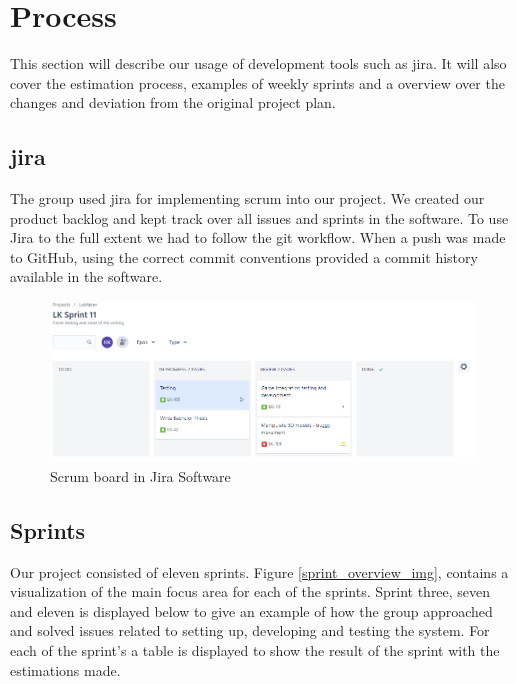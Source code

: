 \section{Process}

This section will describe our usage of development tools such as \Gls{jira}. It will also cover the estimation process, examples of weekly \glspl{sprint} and a overview over the changes and deviation from the original project plan.

\subsection{\Gls{jira}}

The group used \Gls{jira} for implementing scrum into our project. We created our product backlog and kept track over all issues and \glspl{sprint} in the software. To use Jira to the full extent we had to follow the git workflow. When a push was made to GitHub, using the correct commit conventions provided a commit history available in the software. 

\begin{figure}[H]
\centerline{\includegraphics[width=1.0\textwidth]{figures/Jira_scrum board.PNG}}
\caption{Scrum board in Jira Software}
\label{gannt_chart}
\end{figure} 


\subsection{Sprints}
Our project consisted of eleven sprints. Figure \ref{sprint_overview_img}, contains a visualization of the main focus area for each of the sprints. Sprint three, seven and eleven is displayed below to give an example of how the group approached and solved issues related to setting up, developing and testing the system. For each of the sprint's a table is displayed to show the result of the sprint with the estimations made.


